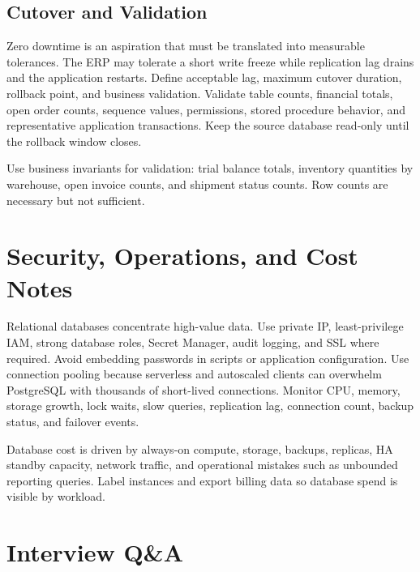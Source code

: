 \subsection{Cutover and Validation}
Zero downtime is an aspiration that must be translated into measurable tolerances. The ERP may tolerate a short write freeze while replication lag drains and the application restarts. Define acceptable lag, maximum cutover duration, rollback point, and business validation. Validate table counts, financial totals, open order counts, sequence values, permissions, stored procedure behavior, and representative application transactions. Keep the source database read-only until the rollback window closes.

\begin{tipbox}
Use business invariants for validation: trial balance totals, inventory quantities by warehouse, open invoice counts, and shipment status counts. Row counts are necessary but not sufficient.
\end{tipbox}

\section{Security, Operations, and Cost Notes}
Relational databases concentrate high-value data. Use private IP, least-privilege IAM, strong database roles, Secret Manager, audit logging, and SSL where required. Avoid embedding passwords in scripts or application configuration. Use connection pooling because serverless and autoscaled clients can overwhelm PostgreSQL with thousands of short-lived connections. Monitor CPU, memory, storage growth, lock waits, slow queries, replication lag, connection count, backup status, and failover events.

\begin{notebox}
Database cost is driven by always-on compute, storage, backups, replicas, HA standby capacity, network traffic, and operational mistakes such as unbounded reporting queries. Label instances and export billing data so database spend is visible by workload.
\end{notebox}

\section{Interview Q\&A}
